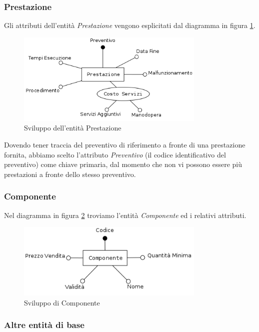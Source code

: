 		\subsubsection{Prestazione}
			
			Gli attributi dell'entità \emph{Prestazione} vengono esplicitati dal diagramma in figura \ref{fig:prestazione}.
		
			\begin{figure}[H]
				\centering
				\includegraphics[width=9cm]{images/finitures/prestazione.png}
				\caption{Sviluppo dell'entità Prestazione}
				\label{fig:prestazione}
			\end{figure}
			
			Dovendo tener traccia del preventivo di riferimento a fronte di una prestazione fornita, abbiamo scelto l'attributo \emph{Preventivo} (il codice identificativo del preventivo) come chiave primaria, dal momento che non vi possono essere più prestazioni a fronte dello stesso preventivo.
		
		\subsubsection{Componente}
			
			Nel diagramma in figura \ref{fig:componente} troviamo l'entità \emph{Componente} ed i relativi attributi.
			
			\begin{figure}[H]
				\centering
				\includegraphics[width=9cm]{images/finitures/componente.png}
				\caption{Sviluppo di Componente}
				\label{fig:componente}
			\end{figure}
		
		\subsubsection{Altre entità di base}
		
